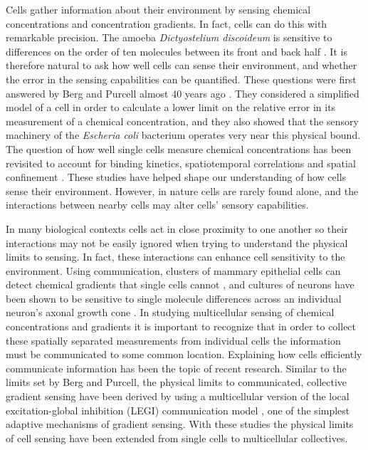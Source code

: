 \documentclass[phys,prelim]{puthesis}
\begin{document}
Cells gather information about their environment by sensing chemical concentrations and concentration gradients. In fact, cells can do this with remarkable precision. The amoeba \textit{Dictyostelium discoideum} is sensitive to differences on the order of ten molecules between its front and back half \cite{song2006dictyostelium}. It is therefore natural to ask how well cells can sense their environment, and whether the error in the sensing capabilities can be quantified. These questions were first answered by Berg and Purcell almost 40 years ago \cite{berg1977physics}. They considered a simplified model of a cell in order to calculate a lower limit on the relative error in its measurement of a chemical concentration, and they also showed that the sensory machinery of the \textit{Escheria coli} bacterium operates very near this physical bound. The question of how well single cells measure chemical concentrations has been revisited to account for binding kinetics, spatiotemporal correlations and spatial confinement \cite{bialek2005physical, kaizu2014berg, bicknell2015limits}. These studies have helped shape our understanding of how cells sense their environment. However, in nature cells are rarely found alone, and the interactions between nearby cells may alter cells' sensory capabilities.

In many biological contexts cells act in close proximity to one another so their interactions may not be easily ignored when trying to understand the physical limits to sensing. In fact, these interactions can enhance cell sensitivity to the environment. Using communication, clusters of mammary epithelial cells can detect chemical gradients that single cells cannot \cite{ellison2015cell}, and cultures of neurons have been shown to be sensitive to single molecule differences across an individual neuron's axonal growth cone \cite{rosoff2004new}. In studying multicellular sensing of chemical concentrations and gradients it is important to recognize that in order to collect these spatially separated measurements from individual cells the information must be communicated to some common location. Explaining how cells efficiently communicate information has been the topic of recent research. Similar to the limits set by Berg and Purcell, the physical limits to communicated, collective gradient sensing have been derived \cite{mugler2015limits,ellison2015cell} by using a multicellular version of the local excitation-global inhibition (LEGI) communication model \cite{levchenko2002models}, one of the simplest adaptive mechanisms of gradient sensing. With these studies the physical limits of cell sensing have been extended from single cells to multicellular collectives.
\end{document}
